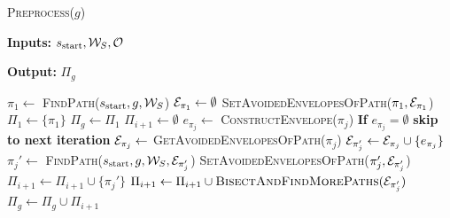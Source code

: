 \documentclass[a4paper]{report}
\begin{document}
\newlength{\textfloatsepsave}
\setlength{\textfloatsepsave}{\textfloatsep}
\setlength{\textfloatsep}{0pt}
\begin{algorithm}[t]
\caption{\textsc{Preprocess($g$)}} \label{alg1}

\hspace*{\algorithmicindent} \textbf{Inputs:} $s_{\textrm{start}}, \mathcal{W}_S, \mathcal{O}$

\hspace*{\algorithmicindent} \textbf{Output:} $\Pi_g$
\begin{algorithmic}[1]
\State $\pi_1 \leftarrow$ \textsc{FindPath}($s_{\textrm{start}},g,\mathcal{W}_S$)
\State $\mathcal{E}_{\pi_1} \leftarrow \emptyset$
\State \textsc{SetAvoidedEnvelopesOfPath($\pi_1,\mathcal{E}_{\pi_1}$)}
\State $\Pi_1 \leftarrow \{\pi_1\}$
\State $\Pi_g \leftarrow \Pi_1$
    \label{alg1:l1}
    \State $\Pi_{i+1} \leftarrow \emptyset$
     \label{alg1:l2}
    \State $e_{\pi_j} \leftarrow$ \textsc{ConstructEnvelope($\pi_j$)}
    \State \textbf{If} $e_{\pi_j} = \emptyset$ \textbf{skip to next iteration}
        \State $\mathcal{E}_{\pi_j} \leftarrow$ \textsc{GetAvoidedEnvelopesOfPath}($\pi_j$)
        \State $\mathcal{E}_{\pi_j'} \leftarrow \mathcal{E}_{\pi_j} \cup \{e_{\pi_j}\}$
        \State $\pi_j' \leftarrow$ \textsc{FindPath}($s_{\textrm{start}},g,\mathcal{W}_S,\mathcal{E}_{\pi_j'}$) 
            \State \textsc{SetAvoidedEnvelopesOfPath($\pi_j', \mathcal{E}_{\pi_j'}$)}
            \State $\Pi_{i+1} \leftarrow \Pi_{i+1} \cup \{\pi_j'\}$
        \Else
            \State $\Pi_{i+1} \leftarrow \Pi_{i+1} \cup \textsc{BisectAndFindMorePaths}(\mathcal{E}_{\pi_j'})$ \label{alg1:bisect}
    \EndIf
    \EndFor
    \State $\Pi_g \leftarrow \Pi_g \cup \Pi_{i+1}$
\EndFor
\end{algorithmic}
\end{algorithm}
\setlength{\textfloatsep}{\textfloatsepsave}
\end{document}
